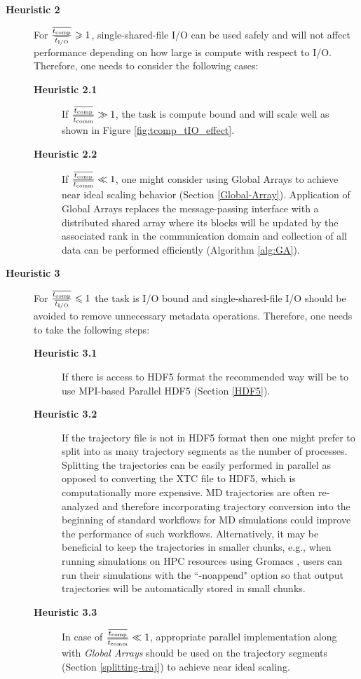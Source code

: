 \begin{description}
\item[\textbf{Heuristic 2}] For $\frac{\overline{{t}_{\text{comp}}}}{\overline{{t}_{\text{I/O}}}} \geqslant 1$, single-shared-file I/O can be used safely and will not affect performance depending on how large is compute with respect to I/O. Therefore, one needs to consider the following cases: 
  \begin{description}
  \item[\textbf{Heuristic 2.1}] If $\frac{\overline{{t}_{\text{comp}}}}{\overline{t_{\text{comm}}}} \gg 1$, the task is compute bound and will scale well as shown in Figure \ref{fig:tcomp_tIO_effect}. 
  \item[\textbf{Heuristic 2.2}] If $\frac{\overline{{t}_{\text{comp}}}}{\overline{t_{\text{comm}}}} \ll 1$, one might consider using Global Arrays to achieve near ideal scaling behavior (Section \ref{Global-Array}).  Application of Global Arrays replaces the message-passing interface with a distributed shared array where its blocks will be updated by the associated rank in the communication domain and collection of all data can be performed efficiently (Algorithm \ref{alg:GA}).
  \end{description}
\item[\textbf{Heuristic 3}] For $\frac{\overline{{t}_{\text{comp}}}}{\overline{{t}_{\text{I/O}}}} \leqslant 1$ the task is I/O bound and single-shared-file I/O should be avoided to remove unnecessary metadata operations. Therefore, one needs to take the following steps:  
  \begin{description}
    \item[\textbf{Heuristic 3.1}] If there is access to HDF5 format the recommended way will be to use MPI-based Parallel HDF5 (Section \ref{HDF5}). 
    \item[\textbf{Heuristic 3.2}] If the trajectory file is not in HDF5 format then one might prefer to split into as many trajectory segments as the number of processes.
      Splitting the trajectories can be easily performed in parallel as opposed to converting the XTC file to HDF5, which is computationally more expensive.
      MD trajectories are often re-analyzed and therefore incorporating trajectory conversion into the beginning of standard workflows for MD simulations could improve the performance of such workflows.
      Alternatively, it may be beneficial to keep the trajectories in smaller chunks, e.g., when running simulations on HPC resources using Gromacs \cite{Gromacs3, Gromacs1}, users can run their simulations with the ``-noappend" option so that output trajectories will be automatically stored in small chunks.
    \item[\textbf{Heuristic 3.3}] In case of $\frac{\overline{{t}_{\text{comp}}}}{\overline{t_{\text{comm}}}} \ll 1$, appropriate parallel implementation along with \emph{Global Arrays} should be used on the trajectory segments (Section \ref{splitting-traj}) to achieve near ideal scaling.
  \end{description}
\end{description}
